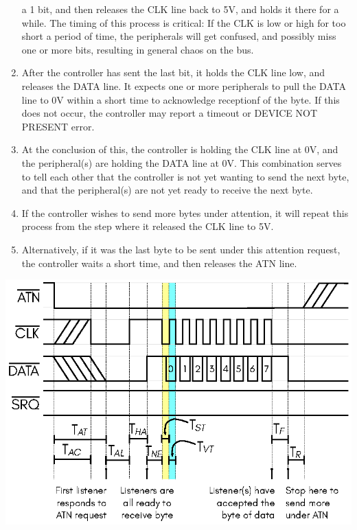 \begin{enumerate}
  a 1 bit, and then releases the CLK line back to 5V, and holds it
  there for a while.  The timing of this process is critical: If the
  CLK is low or high for too short a period of time, the peripherals
  will get confused, and possibly miss one or more bits, resulting
  in general chaos on the bus.
\item After the controller has sent the last bit, it holds the CLK
  line low, and releases the DATA line. It expects one or more
  peripherals to pull the DATA line to 0V within a short time to
  acknowledge receptionf of the byte. If this does not occur, the
  controller may report a timeout or DEVICE NOT PRESENT error.
\item At the conclusion of this, the controller is holding the
  CLK line at 0V, and the peripheral(s) are holding the DATA
  line at 0V. This combination serves to tell each other that
  the controller is not yet wanting to send the next byte, and
  that the peripheral(s) are not yet ready to receive the next
  byte.
\item If the controller wishes to send more bytes under
  attention, it will repeat this process from the step where
  it released the CLK line to 5V.
\item Alternatively, if it was the last byte to be sent
  under this attention request, the controller waits a short
  time, and then releases the ATN line.
\end{enumerate}

\begin{center}
\includegraphics{images/IEC-Timing-Diagrams/IEC-Timing-Diagram-ATN-Send-Byte}
\end{center}

